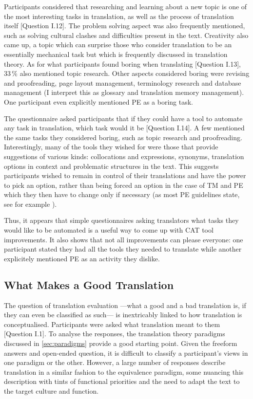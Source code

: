 Participants considered that researching and learning about a new topic is one of the most interesting tasks in translation, as well as the process of translation itself [Question I.12]. The problem solving aspect was also frequently mentioned, such as solving cultural clashes and difficulties present in the text. Creativity also came up, a topic which can surprise those who consider translation to be an essentially mechanical task but which is frequently discussed in translation theory. As for what participants found boring when translating [Question I.13], 33\,\% also mentioned topic research. Other aspects considered boring were revising and proofreading, page layout management, terminology research and database management (I interpret this as glossary and translation memory management). One participant even explicitly mentioned \ac{PE} as a boring task.

The questionnaire asked participants that if they could have a tool to automate any task in translation, which task would it be [Question I.14]. A few mentioned the same tasks they considered boring, such as topic research and proofreading. Interestingly, many of the tools they wished for were those that provide suggestions of various kinds: collocations and expressions, synonyms, translation options in context and problematic structures in the text. This suggests participants wished to remain in control of their translations and have the power to pick an option, rather than being forced an option in the case of \ac{TM} and \ac{PE} which they then have to change only if necessary (as most \ac{PE} guidelines state, see for example \textcite{carl2015post}). 

Thus, it appears that simple questionnaires asking translators what tasks they would like to be automated is a useful way to come up with \ac{CAT} tool improvements. It also shows that not all improvements can please everyone: one participant stated they had all the tools they needed to translate while another explicitely mentioned \ac{PE} as an activity they dislike.


\subsection{What Makes a Good Translation}

\noindent The question of translation evaluation ---what a good and a bad translation is, if they can even be classified as such--- is inextricably linked to how translation is conceptualised. Participants were asked what translation meant to them [Question I.1]. To analyse the responses, the translation theory paradigms discussed in \autoref{sec:paradigms} provide a good starting point. Given the freeform answers and open-ended question, it is difficult to classify a participant's views in one paradigm or the other. However, a large number of responses describe translation in a similar fashion to the equivalence paradigm, some nuancing this description with tints of functional priorities and the need to adapt the text to the target culture and function. 


